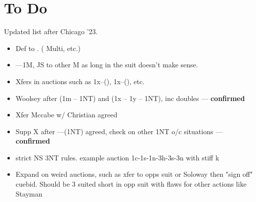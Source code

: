 \documentclass[main]{subfile}
\begin{document}
	
	\chapter{To Do}
	
	Updated list after Chicago '23.
	
	\begin{itemize}
		\item Def to .  ( Multi, etc.)
		\item {}----1M, JS to other M as long in the suit doesn't make sense.
		\item Xfers in auctions such as 1x--(), 1x--(), etc.
		\item Woolsey after (1m -- 1NT) and (1x -- 1y -- 1NT), inc doubles  --- \textbf{confirmed}
		\item Xfer Mccabe w/ Christian agreed
		\item Supp X after ----(1NT) agreed, check on other 1NT o/c situations --- \textbf{confirmed}
		\item strict NS 3NT rules.  example auction 1c-1s-1n-3h-3s-3n with stiff k
		\item Expand on weird auctions, such as xfer to opps suit or Soloway  then "sign off" cuebid. Should be 3 suited short in opp suit with flaws for other actions like Stayman
	\end{itemize}
\end{document}
